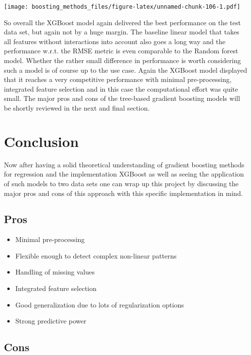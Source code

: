 \documentclass[
]{book}
\begin{document}
\texttt{[image: boosting\_methods\_files/figure-latex/unnamed-chunk-106-1.pdf]}

So overall the XGBoost model again delivered the best performance on the test data set, but again not by a huge margin. The baseline linear model that takes all features without interactions into account also goes a long way and the performance w.r.t. the RMSE metric is even comparable to the Random forest model. Whether the rather small difference in performance is worth considering such a model is of course up to the use case. Again the XGBoost model displayed that it reaches a very competitive performance with minimal pre-processing, integrated feature selection and in this case the computational effort was quite small. The major pros and cons of the tree-based gradient boosting models will be shortly reviewed in the next and final section.

\hypertarget{conclusion}{%
\chapter{Conclusion}\label{conclusion}}

Now after having a solid theoretical understanding of gradient boosting methods for regression and the implementation XGBoost as well as seeing the application of such models to two data sets one can wrap up this project by discussing the major pros and cons of this approach with this specific implementation in mind.

\hypertarget{pros}{%
\section{Pros}\label{pros}}

\begin{itemize}
\item
  Minimal pre-processing
\item
  Flexible enough to detect complex non-linear patterns
\item
  Handling of missing values
\item
  Integrated feature selection
\item
  Good generalization due to lots of regularization options
\item
  Strong predictive power
\end{itemize}

\hypertarget{cons}{%
\section{Cons}\label{cons}}
\end{document}
